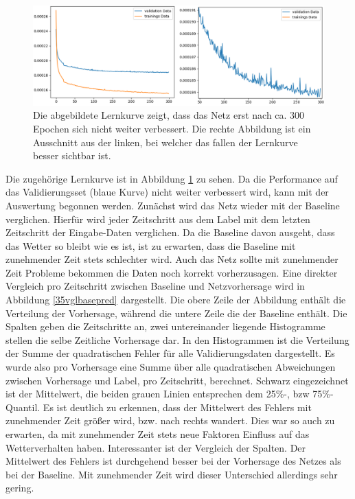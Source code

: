 \begin{figure}[h]
	\centering
	\includegraphics[width=\linewidth]{pics/lc_35minMSE.png}
	\caption[Lernkurve des UNet zur 35 Minuten Radar-Vorhersage]{Die abgebildete Lernkurve zeigt, dass das Netz erst nach ca. 300 Epochen sich nicht weiter verbessert. Die rechte Abbildung ist ein Ausschnitt aus der linken, bei welcher das fallen der Lernkurve besser sichtbar ist.}
	\label{lc_35minMSE}
\end{figure}

Die zugehörige Lernkurve ist in Abbildung \ref{lc_35minMSE} zu sehen. Da die Performance auf das Validierungsset (blaue Kurve) nicht weiter verbessert wird, kann mit der Auswertung begonnen werden.
Zunächst wird das Netz wieder mit der Baseline verglichen. Hierfür wird jeder Zeitschritt aus dem Label mit dem letzten Zeitschritt der Eingabe-Daten verglichen. Da die Baseline davon ausgeht, dass das Wetter so bleibt wie es ist, ist zu erwarten, dass die Baseline mit zunehmender Zeit stets schlechter wird. Auch das Netz sollte mit zunehmender Zeit Probleme bekommen die Daten noch korrekt vorherzusagen. Eine direkter Vergleich pro Zeitschritt zwischen Baseline und Netzvorhersage wird in Abbildung \ref{35vglbasepred} dargestellt.
Die obere Zeile der Abbildung enthält die Verteilung der Vorhersage, während die untere Zeile die der Baseline enthält. Die Spalten geben die Zeitschritte an, zwei untereinander liegende Histogramme stellen die selbe Zeitliche Vorhersage dar. 
In den Histogrammen ist die Verteilung der Summe der quadratischen Fehler für alle Validierungsdaten dargestellt. Es wurde also pro Vorhersage eine Summe über alle quadratischen Abweichungen zwischen Vorhersage und Label, pro Zeitschritt, berechnet.
Schwarz eingezeichnet ist der Mittelwert, die beiden grauen Linien entsprechen dem 25\%-, bzw 75\%-Quantil. Es ist deutlich zu erkennen, dass der Mittelwert des Fehlers mit zunehmender Zeit größer wird, bzw. nach rechts wandert. Dies war so auch zu erwarten, da mit zunehmender Zeit stets neue Faktoren Einfluss auf das Wetterverhalten haben. Interessanter ist der Vergleich der Spalten. Der Mittelwert des Fehlers ist durchgehend besser bei der Vorhersage des Netzes als bei der Baseline. Mit zunehmender Zeit wird dieser Unterschied allerdings sehr gering.

